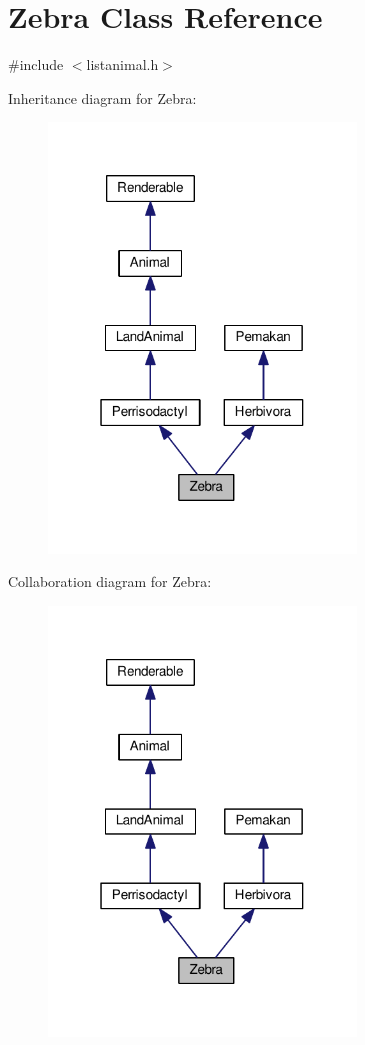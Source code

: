 \hypertarget{classZebra}{}\section{Zebra Class Reference}
\label{classZebra}


{\ttfamily \#include $<$listanimal.\+h$>$}



Inheritance diagram for Zebra\+:
\nopagebreak
\begin{figure}[H]
\begin{center}
\leavevmode
\includegraphics[width=232pt]{classZebra__inherit__graph}
\end{center}
\end{figure}


Collaboration diagram for Zebra\+:
\nopagebreak
\begin{figure}[H]
\begin{center}
\leavevmode
\includegraphics[width=232pt]{classZebra__coll__graph}
\end{center}
\end{figure}
